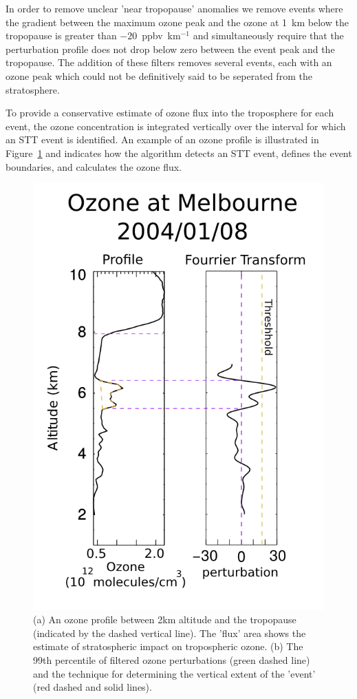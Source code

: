     In order to remove unclear 'near tropopause' anomalies we remove events where the gradient between the maximum ozone peak and the ozone at 1~km below the tropopause is greater than $-20$~ppbv~km$^{-1}$ and simultaneously require that the perturbation profile does not drop below zero between the event peak and the tropopause.
    The addition of these filters removes several events, each with an ozone peak which could not be definitively said to be seperated from the stratosphere.
    
    To provide a conservative estimate of ozone flux into the troposphere for each event, the ozone concentration is integrated vertically over the interval for which an STT event is identified.
    An example of an ozone profile is illustrated in Figure~\ref{ch_o3:fig:filterEG} and indicates how the algorithm detects an STT event, defines the event boundaries, and calculates the ozone flux.
    
    \begin{figure}[!htbp]
      \includegraphics[width=\columnwidth]{Figures/Ozone/filtereg.png}
      \caption{ (a) An ozone profile between 2km altitude and the tropopause (indicated by the dashed vertical line).
      The 'flux' area shows the estimate of stratospheric impact on tropospheric ozone.
      (b) The 99th percentile of filtered ozone perturbations (green dashed line) and the technique for determining the vertical extent of the 'event' (red dashed and solid lines).%
      }
      \label{ch_o3:fig:filterEG}
    \end{figure}
    
